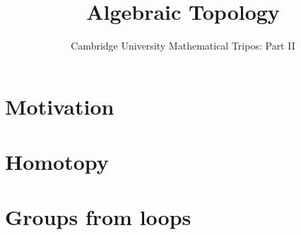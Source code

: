 \documentclass{article}
\title{Algebraic Topology}
\author{Cambridge University Mathematical Tripos: Part II}
\begin{document}
\maketitle

\tableofcontentsnewpage{}

\section{Motivation}

\section{Homotopy}

\section{Groups from loops}

\end{document}
